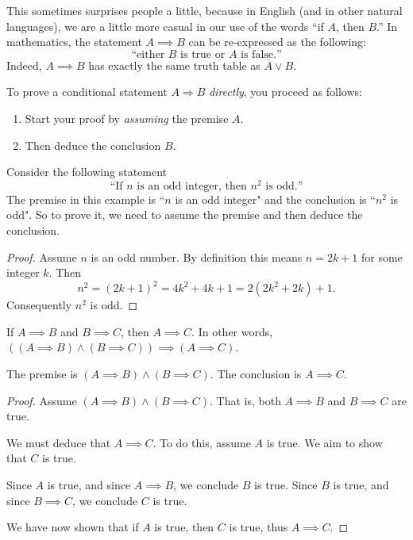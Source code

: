 \documentclass[11pt,dvipsnames]{book}
\numberwithin{figure}{section} %
\numberwithin{table}{section} %
\begin{document}
This sometimes surprises people a little, because in English (and in other natural languages), we are a little more casual in our use of the words ``if $A$, then $B$.''
In mathematics, the statement $A \implies B$ can be re-expressed as the following:
\[
    \text{``either $B$ is true or $A$ is false.''}
\]
Indeed, $A \implies B$ has exactly the same truth table as $\overline{A} \vee B$.

To prove a conditional statement $A\Longrightarrow B$ \emph{directly}, you proceed as follows:
\begin{enumerate}[label=(\alph*)]
\item Start your proof by \emph{assuming} the premise $A$. 
\item Then deduce the conclusion $B$.
\end{enumerate}

\begin{example}
Consider the following statement
\[
\text{``If $n$ is an odd integer, then $n^2$ is odd.''}
\]
The premise in this example is ``$n$ is an odd integer" and the conclusion is ``$n^2$ is odd".
So to prove it, we need to assume the premise and then deduce the conclusion.
\begin{proof}
Assume $n$ is an odd number.
By definition this means $n=2k+1$ for some integer $k$.
Then
\[
n^2=(2k+1)^2=4k^2+4k+1=2(2k^2+2k)+1.
\]
Consequently $n^2$ is odd. 
\end{proof}
\end{example}

\begin{example}
If $A\implies B$ and $B\implies C$, then $A\implies C$.
In other words, $((A \implies B) \wedge (B \implies C)) \implies (A \implies C)$.

The premise is $(A\implies B)\wedge(B\implies C)$.
The conclusion is $A\implies C$.
\begin{proof}
Assume $(A\implies B)\wedge(B\implies C)$.
That is, both $A \implies B$ and $B \implies C$ are true.

We must deduce that $A\implies C$.
To do this, assume $A$ is true.
We aim to show that $C$ is true. 

Since $A$ is true, and since $A\implies B$, we conclude $B$ is true.
Since $B$ is true, and since $B\implies C$, we conclude $C$ is true.

We have now shown that if $A$ is true, then $C$ is true, thus $A\implies C$.
\end{proof}
\end{example}
\end{document}
